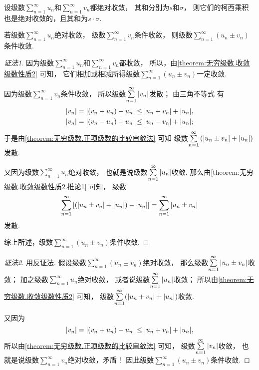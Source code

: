 \begin{theorem}\label{theorem:无穷级数.绝对收敛级数的柯西乘积必收敛}
设级数\(\sum\limits_{n=1}^\infty u_n\)和\(\sum\limits_{n=1}^\infty v_n\)都绝对收敛，
其和分别为\(s\)和\(\sigma\)，
则它们的柯西乘积也是绝对收敛的，且其和为\(s \cdot \sigma\).
\end{theorem}

\begin{proposition}
若级数\(\sum\limits_{n=1}^\infty u_n\)绝对收敛，
级数\(\sum\limits_{n=1}^\infty v_n\)条件收敛，
则级数\(\sum\limits_{n=1}^\infty (u_n \pm v_n)\)条件收敛.
\begin{proof}[证法1]
因为级数\(\sum\limits_{n=1}^\infty u_n\)和\(\sum\limits_{n=1}^\infty v_n\)都收敛，
所以，由\cref{theorem:无穷级数.收敛级数性质2} 可知，
它们相加或相减所得级数\(\sum\limits_{n=1}^\infty (u_n \pm v_n)\)一定收敛.

因为级数\(\sum\limits_{n=1}^\infty v_n\)条件收敛，
所以级数\(\sum\limits_{n=1}^\infty \abs{v_n}\)发散；
由三角不等式  有\begin{align*}
	\abs{v_n}
	= \abs{(v_n + u_n) - u_n}
	\leq \abs{u_n + v_n} + \abs{u_n}, \\
	\abs{v_n}
	= \abs{(v_n - u_n) + u_n}
	\leq \abs{u_n - v_n} + \abs{u_n};
\end{align*}
于是由\cref{theorem:无穷级数.正项级数的比较审敛法} 可知
级数\(\sum\limits_{n=1}^\infty \left( \abs{u_n \pm v_n} + \abs{u_n} \right)\)发散.

又因为级数\(\sum\limits_{n=1}^\infty u_n\)绝对收敛，
也就是说级数\(\sum\limits_{n=1}^\infty \abs{u_n}\)收敛.
那么由\cref{theorem:无穷级数.收敛级数性质2.推论1} 可知，
级数\[
	\sum\limits_{n=1}^\infty \left[
		\left( \abs{u_n \pm v_n} + \abs{u_n} \right) - \abs{u_n}
	\right]
	= \sum\limits_{n=1}^\infty \abs{u_n \pm v_n}
\]发散.

综上所述，级数\(\sum\limits_{n=1}^\infty (u_n \pm v_n)\)条件收敛.
\end{proof}
\begin{proof}[证法2]
用反证法.
假设级数\(\sum\limits_{n=1}^\infty (u_n \pm v_n)\)绝对收敛，
那么级数\(\sum\limits_{n=1}^\infty \abs{u_n \pm v_n}\)收敛；
加之级数\(\sum\limits_{n=1}^\infty u_n\)绝对收敛，
或者说级数\(\sum\limits_{n=1}^\infty \abs{u_n}\)收敛；
所以由\cref{theorem:无穷级数.收敛级数性质2} 可知，
级数\(\sum\limits_{n=1}^\infty (\abs{u_n + v_n} + \abs{u_n})\)收敛.

又因为\[
	\abs{v_n}
	= \abs{(v_n + u_n) - u_n}
	\leq \abs{u_n + v_n} + \abs{u_n},
\]
所以由\cref{theorem:无穷级数.正项级数的比较审敛法} 可知，
级数\(\sum\limits_{n=1}^\infty \abs{v_n}\)收敛，
也就是说级数\(\sum\limits_{n=1}^\infty v_n\)绝对收敛，矛盾！
因此级数\(\sum\limits_{n=1}^\infty (u_n \pm v_n)\)条件收敛.
\end{proof}
\end{proposition}

